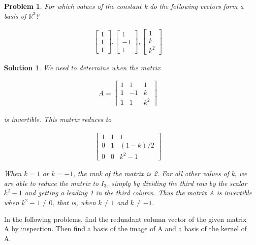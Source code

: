 \documentclass{article}
\newtheorem{problem}{Problem}
\newtheorem*{solution}{Solution}
\begin{document}
\begin{problem}
For which values of the constant k do the following vectors form a basis of $\mathbb{R}^3$?

\begin{align*}
\begin{bmatrix} 1 \\ 1 \\ 1 \end{bmatrix}, \begin{bmatrix} 1 \\ -1 \\ 1 \end{bmatrix}, \begin{bmatrix} 1 \\ k \\ k^2 \end{bmatrix}
\end{align*}
\end{problem}

\begin{solution}
We need to determine when the matrix 

\begin{align*}
A = \begin{bmatrix} 1 & 1 & 1 \\ 1 & -1 & k \\ 1 & 1 & k^2 \end{bmatrix} 
\end{align*}

is invertible. This matrix reduces to 

\begin{align*}
\begin{bmatrix} 1 & 1 & 1 \\ 0 & 1 & (1-k)/2 \\ 0 & 0 & k^2-1 \end{bmatrix} 
\end{align*}

When $k = 1$ or $k = -1$, the rank of the matrix is 2. For all other values of k, we are able to reduce the matrix to $I_{3}$, simply by dividing the third row by the scalar $k^2 - 1$ and getting a leading 1 in the third column. Thus the matrix A is invertible when $k^2 - 1 \neq 0$, that is, when $k \neq 1$ and $k \neq -1$.
\end{solution}

In the following problems, find the redundant column vector of the given matrix A by inspection. Then find a basis of the image of A and a basis of the kernel of A.
\end{document}
